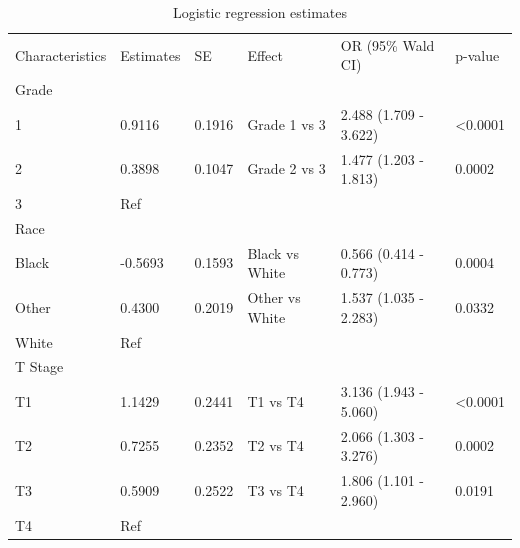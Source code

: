 \documentclass[times,sort&compress,3p]{elsarticle}
\theoremstyle{plain}
\theoremstyle{definition}
\begin{document}
\begin{table}[H]
\centering
\caption{Logistic regression estimates}
\label{table5}
\begin{tabular}{llllll} \hline \hline
Characteristics & Estimates & SE      & Effect         & OR (95\% Wald CI)       & p-value            \\
Grade           &           &         &                &                         &                    \\
1               & 0.9116    & 0.1916  & Grade 1 vs 3   & 2.488 (1.709 - 3.622)   & \textless   0.0001 \\
2               & 0.3898    & 0.1047  & Grade 2 vs 3   & 1.477 (1.203 - 1.813)   & 0.0002             \\
3               & Ref       &         &                &                         &                    \\ \hline
Race            &           &         &                &                         &                    \\
Black           & -0.5693   & 0.1593  & Black vs White & 0.566 (0.414 - 0.773)   & 0.0004             \\
Other           & 0.4300    & 0.2019  & Other vs White & 1.537 (1.035 - 2.283)   & 0.0332             \\
White           & Ref       &         &                &                         &                    \\ \hline
T   Stage       &           &         &                &                         &                    \\
T1              & 1.1429    & 0.2441  & T1 vs T4       & 3.136 (1.943 - 5.060)   & \textless   0.0001 \\
T2              & 0.7255    & 0.2352  & T2 vs T4       & 2.066 (1.303 - 3.276)   & 0.0002             \\
T3              & 0.5909    & 0.2522  & T3 vs T4       & 1.806 (1.101 - 2.960)   & 0.0191             \\
T4              & Ref       &         &                &                         &                    \\ \hline

\end{tabular}
\end{table}
\end{document}
